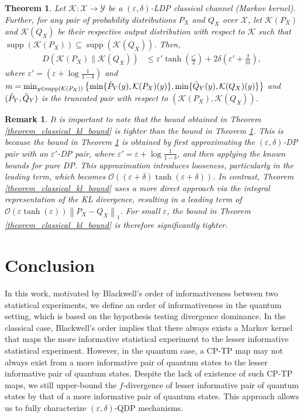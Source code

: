 \documentclass[onecolumn,ldraftcls, 11pt]{IEEEtran}
\newtheorem{theorem}{\bf{Theorem}}
\newcommand{\supp}{\operatorname{supp}}
\newcommand{\eps}{\varepsilon}
\newcommand*{\cK}{\mathcal{K}}
\newcommand*{\cX}{\mathcal{X}}
\newcommand*{\cY}{\mathcal{Y}}
\newcommand{\norm}[2]{{\left\lVert #1 \right\rVert}_{#2}}
\newtheorem{remark}{Remark}
\begin{document}
\begin{theorem}
\label{Genh}
     Let $\cK : \cX \to \cY$ be a $(\eps,\delta)$-LDP classical channel (Markov kernel). Further, for any pair of probability distributions $P_X$ and $Q_X$ over $\cX$, let $\cK(P_X)$ and $\cK(Q_X)$ be their respective output distribution with respect to $\cK$ such that $\supp( \cK(P_X) )\subseteq \supp( \cK(Q_X))$. Then, 
\begin{align*}
    D(\cK(P_X) \| \cK(Q_X)) &\leq \eps'\tanh\left(\frac{\eps'}{2}\right)+ 2 \delta \left( \eps' +  \frac{2}{m} \right),
\end{align*}
where  $\eps' = \left(\eps+\log\frac{1}{1-\delta}\right)$ and $m = \min_{y \in \supp( \cK(P_X))}\left\{\min\{\Tilde{P}_Y(y), \cK(P_X) (y)\},\min\{\Tilde{Q}_Y(y), \cK(Q_X)(y)\}\right\}$ 
and $(\Tilde{P}_Y,\Tilde{Q}_Y)$ is 
the truncated  pair with respect to $(\cK(P_X), \cK(Q_X))$.
\end{theorem}

\begin{remark}
    It is important to note that the bound obtained in Theorem \ref{theorem_classical_kl_bound} is tighter than the bound in Theorem \ref{Genh}. This is because the bound in Theorem \ref{Genh} is obtained by first approximating the $(\eps,\delta)$-DP pair with an $\eps'$-DP pair, where $\eps' = \eps + \log\frac{1}{1-\delta}$, and then applying the known bounds for pure DP. This approximation introduces looseness, particularly in the leading term, which becomes $\mathcal{O}((\eps+\delta)\tanh(\eps+\delta))$. In contrast, Theorem \ref{theorem_classical_kl_bound} uses a more direct approach via the integral representation of the KL divergence, resulting in a leading term of $\mathcal{O}(\eps\tanh(\eps))\norm{P_X-Q_X}{1}$. For small $\eps$, the bound in Theorem \ref{theorem_classical_kl_bound} is therefore significantly tighter.
\end{remark}


\section{Conclusion}

In this work, motivated by Blackwell's order of informativeness \cite{Blackwell51,BG54} between two statistical experiments, we define an order of informativeness in the quantum setting, which is based on the hypothesis testing divergence dominance. In the classical case, Blackwell's order implies that there always exists a Markov kernel that maps the more informative statistical experiment to the lesser informative statistical experiment. However, in the quantum case, a CP-TP map may not always exist \cite{Matsumoto2014} from a more informative pair of quantum states to the lesser informative pair of quantum states. Despite the lack of existence of such CP-TP maps, we still upper-bound the $f$-divergence of lesser informative pair of quantum states by that of a more informative pair of quantum states. This approach allows us to fully characterize $(\eps,\delta)$-QDP mechanisms.
\end{document}

